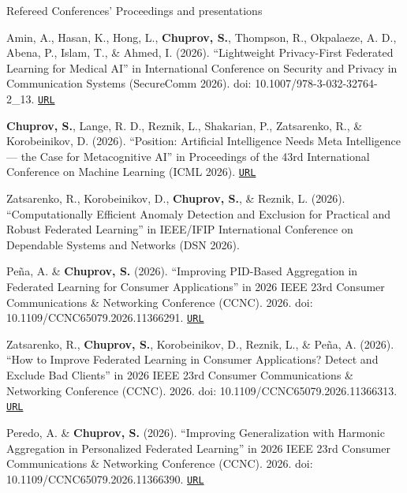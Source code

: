 \begin{rSection}{Refereed Conferences' Proceedings and presentations}
\begin{enumerate}[label=[C{{\arabic*}]}]

\item Amin, A., Hasan, K., Hong, L., \textbf{Chuprov, S.}, Thompson, R., Okpalaeze, A. D., Abena, P., Islam, T., \& Ahmed, I. (2026). ``Lightweight Privacy-First Federated Learning for Medical AI'' in International Conference on Security and Privacy in Communication Systems (SecureComm 2026). doi: 10.1007/978-3-032-32764-2\_13. \href{https://link.springer.com/chapter/10.1007/978-3-032-32764-2_13}{\nolinkurl{URL}}

\item \textbf{Chuprov, S.}, Lange, R. D., Reznik, L., Shakarian, P., Zatsarenko, R., \& Korobeinikov, D. (2026). ``Position: Artificial Intelligence Needs Meta Intelligence --- the Case for Metacognitive AI'' in Proceedings of the 43rd International Conference on Machine Learning (ICML 2026). \href{https://arxiv.org/abs/2605.15567}{\nolinkurl{URL}}

\item Zatsarenko, R., Korobeinikov, D., \textbf{Chuprov, S.}, \& Reznik, L. (2026). ``Computationally Efficient Anomaly Detection and Exclusion for Practical and Robust Federated Learning'' in IEEE/IFIP International Conference on Dependable Systems and Networks (DSN 2026).

\item Peña, A. \& \textbf{Chuprov, S.} (2026). ``Improving PID-Based Aggregation in Federated Learning for Consumer Applications'' in 2026 IEEE 23rd Consumer Communications \& Networking Conference (CCNC). 2026. doi: 10.1109/CCNC65079.2026.11366291. \href{https://ieeexplore.ieee.org/abstract/document/11366291}{\nolinkurl{URL}}

\item Zatsarenko, R., \textbf{Chuprov, S.}, Korobeinikov, D., Reznik, L., \& Peña, A. (2026). ``How to Improve Federated Learning in Consumer Applications? Detect and Exclude Bad Clients'' in 2026 IEEE 23rd Consumer Communications \& Networking Conference (CCNC). 2026. doi: 10.1109/CCNC65079.2026.11366313. \href{https://ieeexplore.ieee.org/abstract/document/11366313}{\nolinkurl{URL}}

\item Peredo, A. \& \textbf{Chuprov, S.} (2026). ``Improving Generalization with Harmonic Aggregation in Personalized Federated Learning'' in 2026 IEEE 23rd Consumer Communications \& Networking Conference (CCNC). 2026. doi: 10.1109/CCNC65079.2026.11366390. \href{https://ieeexplore.ieee.org/abstract/document/11366390}{\nolinkurl{URL}}


\end{enumerate}
\end{rSection}
